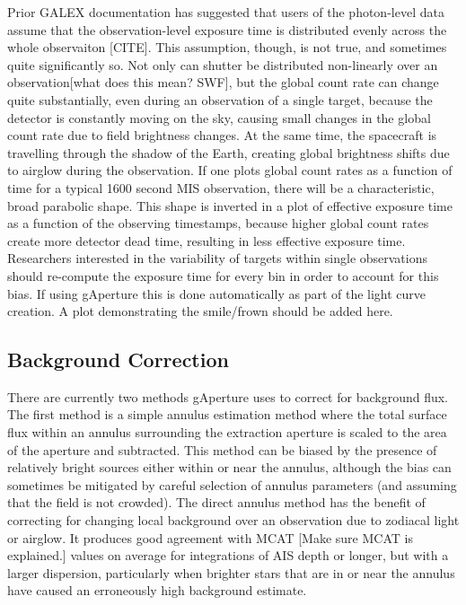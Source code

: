 \documentclass[5p]{elsarticle}
\begin{document}
Prior GALEX documentation has suggested that users of the photon-level data assume that the observation-level exposure time is distributed evenly across the whole observaiton {\color{red}[CITE]}. This assumption, though, is not true, and sometimes quite significantly so. Not only can shutter be distributed non-linearly over an observation{\color{red}[what does this mean? SWF]}, but the global count rate can change quite substantially, even during an observation of a single target, because the detector is constantly moving on the sky, causing small changes in the global count rate due to field brightness changes.  At the same time, the spacecraft is travelling through the shadow of the Earth, creating global brightness shifts due to airglow during the observation. If one plots global count rates as a function of time for a typical 1600 second MIS observation, there will be a characteristic, broad parabolic shape.  This shape is inverted in a plot of effective exposure time as a function of the observing timestamps, because higher global count rates create more detector dead time, resulting in less effective exposure time.  Researchers interested in the variability of targets within single observations should re-compute the exposure time for every bin in order to account for this bias.  If using gAperture this is done automatically as part of the light curve creation.  {\color{red}A plot demonstrating the smile/frown should be added here.}

\subsection{Background Correction}
There are currently two methods gAperture uses to correct for background flux.  The first method is a simple annulus estimation method where the total surface flux within an annulus surrounding the extraction aperture is scaled to the area of the aperture and subtracted. This method can be biased by the presence of relatively bright sources either within or near the annulus, although the bias can sometimes be mitigated by careful selection of annulus parameters (and assuming that the field is not crowded). The direct annulus method has the benefit of correcting for changing local background over an observation due to zodiacal light or airglow. It produces good agreement with MCAT {\color{red}[Make sure MCAT is explained.]} values on average for integrations of AIS depth or longer, but with a larger dispersion, particularly when brighter stars that are in or near the annulus have caused an erroneously high background estimate.
\end{document}
